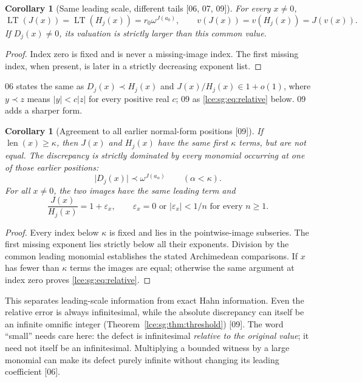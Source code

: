 \documentclass[11pt,letterpaper]{article}
\numberwithin{equation}{section}
\newtheorem{corollary}[theorem]{Corollary}
\theoremstyle{definition}
\theoremstyle{remark}
\newcommand{\LT}{\operatorname{LT}}
\newcommand{\len}{\operatorname{len}}
\newcommand{\eps}{\varepsilon}
\newcommand{\abs}[1]{\lvert#1\rvert}
\newcommand{\thref}[1]{Theorem~\ref{#1}}
\newcommand{\src}[1]{\textup{\textsf{\small[#1]}}}%
\begin{document}
\begin{corollary}[Same leading scale, different tails \src{06, 07, 09}]\label{lce:cor:leading}
For every $x\ne0$,
\[
 \LT(J(x))=\LT(H_j(x))=r_0\omega^{J(a_0)},\qquad
 v(J(x))=v(H_j(x))=J(v(x)).
\]
If $D_j(x)\ne0$, its valuation is strictly larger than this common value.
\end{corollary}
\begin{proof}
Index zero is fixed and is never a missing-image index. The first missing
index, when present, is later in a strictly decreasing exponent list.
\end{proof}
06 states the same as $D_j(x)\prec H_j(x)$ and $J(x)/H_j(x)\in1+o(1)$,
where $y\prec z$ means $\abs y<c\abs z$ for every positive real $c$; 09 as
\eqref{lce:sg:eq:relative} below. 09 adds a sharper form.

\begin{corollary}[Agreement to all earlier normal-form positions \src{09}]
\label{lce:sg:cor:earlier}
If $\len(x)\ge\kappa$, then $J(x)$ and $H_j(x)$ have the same first
$\kappa$ terms, but are not equal. The discrepancy is strictly dominated by
every monomial occurring at one of those earlier positions:
\[
 \abs{D_j(x)}\prec\omega^{J(a_\alpha)}\qquad(\alpha<\kappa).
\]
For all $x\ne0$, the two images have the same leading term and
\begin{equation}\label{lce:sg:eq:relative}
 \frac{J(x)}{H_j(x)}=1+\eps_x,
 \qquad \eps_x=0\text{ or }\abs{\eps_x}<1/n\text{ for every }n\ge1.
\end{equation}
\end{corollary}
\begin{proof}
Every index below $\kappa$ is fixed and lies in the pointwise-image
subseries. The first missing exponent lies strictly below all their
exponents. Division by the common leading monomial establishes the stated
Archimedean comparisons. If $x$ has fewer than $\kappa$ terms the images are
equal; otherwise the same argument at index zero proves
\eqref{lce:sg:eq:relative}.
\end{proof}
This separates leading-scale information from exact Hahn information. Even
the relative error is always infinitesimal, while the absolute discrepancy
can itself be an infinite omnific integer (\thref{lce:sg:thm:threshold})
\src{09}. The word ``small'' needs care here: the defect is infinitesimal
\emph{relative to the original value}; it need not itself be an
infinitesimal. Multiplying a bounded witness by a large monomial can make
its defect purely infinite without changing its leading coefficient
\src{06}.
\end{document}
